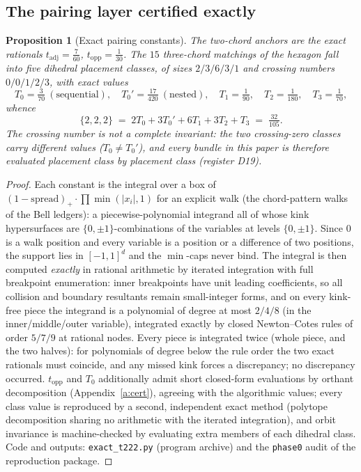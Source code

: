 \documentclass[11pt]{article}
\numberwithin{equation}{section}
\newtheorem{proposition}[theorem]{Proposition}
\theoremstyle{definition}
\theoremstyle{remark}
\begin{document}
\subsection{The pairing layer certified exactly}\label{s:five:cert}

\begin{proposition}[Exact pairing constants]\label{p:t222}
The two-chord anchors are the exact rationals
$t_{\mathrm{adj}}=\tfrac7{60}$, $t_{\mathrm{opp}}=\tfrac1{30}$.
The $15$ three-chord matchings of the hexagon fall into
\emph{five} dihedral placement classes, of sizes $2/3/6/3/1$ and
crossing numbers $0/0/1/2/3$, with exact values
\[
T_0=\tfrac3{70}\ (\text{sequential}),\quad
T_0'=\tfrac{17}{420}\ (\text{nested}),\quad
T_1=\tfrac1{90},\quad T_2=\tfrac1{180},\quad T_3=\tfrac1{70},
\]
whence
\[
\{2,2,2\}\;=\;2T_0+3T_0'+6T_1+3T_2+T_3\;=\;\tfrac{32}{105}.
\]
The crossing number is \emph{not} a complete invariant: the two
crossing-zero classes carry different values
($T_0\ne T_0'$), and every bundle in this paper is therefore
evaluated placement class by placement class (register D19).
\end{proposition}

\begin{proof}
Each constant is the integral over a box of
$(1-\mathrm{spread})_+\cdot\prod\min(|x_i|,1)$ for an explicit
walk (the chord-pattern walks of the Bell ledgers): a
piecewise-polynomial integrand all of whose kink hypersurfaces
are $\{0,\pm1\}$-combinations of the variables at levels
$\{0,\pm1\}$. Since $0$ is a walk position and every variable is
a position or a difference of two positions, the support lies in
$[-1,1]^d$ and the $\min$-caps never bind. The integral is then
computed \emph{exactly} in rational arithmetic by iterated
integration with full breakpoint enumeration: inner breakpoints
have unit leading coefficients, so all collision and boundary
resultants remain small-integer forms, and on every kink-free
piece the integrand is a polynomial of degree at most $2/4/8$ (in
the inner/middle/outer variable), integrated exactly by closed
Newton--Cotes rules of order $5/7/9$ at rational nodes. Every
piece is integrated twice (whole piece, and the two halves): for
polynomials of degree below the rule order the two exact
rationals must coincide, and any missed kink forces a
discrepancy; no discrepancy occurred. $t_{\mathrm{opp}}$ and
$T_0$ additionally admit short closed-form evaluations by orthant
decomposition (Appendix~\ref{a:cert}), agreeing with the
algorithmic values; every class value is reproduced by a second,
independent exact method (polytope decomposition sharing no
arithmetic with the iterated integration), and orbit invariance
is machine-checked by evaluating extra members of each dihedral
class. Code and outputs:
\texttt{exact\_t222.py} (program archive) and the
\texttt{phase0} audit of the reproduction package.
\end{proof}
\end{document}
